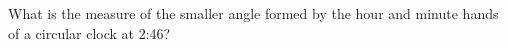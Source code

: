 What is the measure of the smaller angle formed by the hour and minute hands of a circular clock at 2:46?
